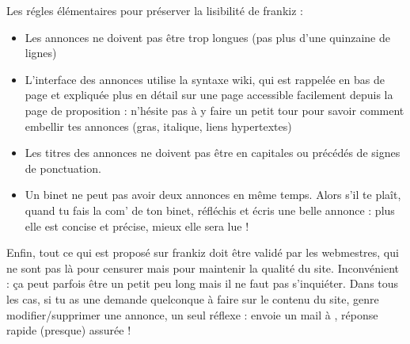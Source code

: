Les régles élémentaires pour préserver la lisibilité de frankiz :
\begin{itemize}
 \item Les annonces ne doivent pas être trop longues (pas plus d'une quinzaine de lignes)
 \item L'interface des annonces utilise la syntaxe wiki, qui est rappelée en bas de page et expliquée plus en détail
        sur une page accessible facilement depuis la page de proposition :
        n'hésite pas à y faire un petit tour pour savoir comment embellir tes annonces
        (gras, italique, liens hypertextes)
 \item Les titres des annonces ne doivent pas être en capitales ou précédés de signes de ponctuation.
 \item Un binet ne peut pas avoir deux annonces en même temps.
       Alors s'il te plaît, quand tu fais la com' de ton binet, réfléchis et écris une belle annonce :
       plus elle est concise et précise, mieux elle sera lue !
\end{itemize}

Enfin, tout ce qui est proposé sur frankiz doit être validé par les
webmestres, qui ne sont pas là pour censurer mais pour maintenir la
qualité du site. Inconvénient : ça peut parfois être un petit peu
long mais il ne faut pas s'inquiéter. Dans tous les cas, si tu as une
demande quelconque à faire sur le contenu du site, genre
modifier/supprimer une annonce, un seul réflexe : envoie un mail à
, réponse rapide (presque) assurée !
